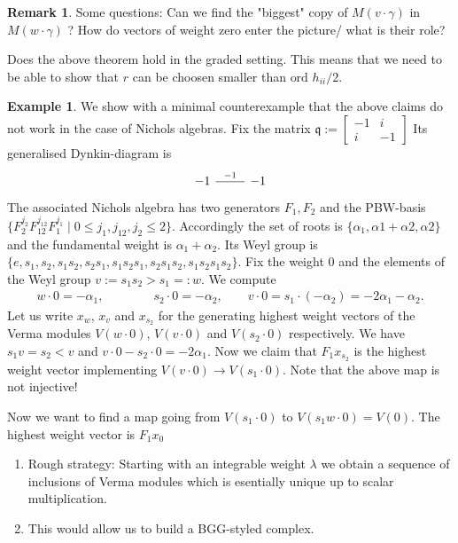 \documentclass{amsart}
\theoremstyle{definition}
\newtheorem*{remark}{Remark}
\newtheorem{example}[theorem]{Example}
\begin{document}
\begin{remark}
	Some questions:
	Can we find the "biggest" copy of $M(v \cdot\gamma)$ in $M(w \cdot \gamma)$ ?
	How do vectors of weight zero enter the picture/ what is their role?
	
	Does the above theorem hold in the graded setting. This means that we need to be able to show that $r$ can be choosen smaller than $\text{ord } h_{ii}/2$.
\end{remark}



\begin{example}
	We show with a minimal counterexample that the above claims do not work in the case of Nichols algebras.	
	Fix the matrix 
	$\mathfrak q:= 
	\begin{bmatrix}
		-1 & i \\
		i & -1
	\end{bmatrix}
	$
	Its generalised Dynkin-diagram is
	\begin{equation}
		\begin{tikzcd}[arrows=-]
		 -1 \arrow[r, "-1"] &
		 -1
		\end{tikzcd}
	\end{equation}
	The associated Nichols algebra has two generators $F_1, F_2$ and the 
	PBW-basis $\{F_2^{j_2} F_{12}^{j_{12}} F_1^{j_1} \mid 0 \leq j_1, j_{12}, j_2 \leq 2\}$.
	Accordingly the set of roots is $\{\alpha_1, \alpha 1+ \alpha 2, \alpha 2\}$ and the fundamental weight is $\alpha_1 + \alpha_2$.
	Its Weyl group is $\{e, s_1, s_2, s_1 s_2, s_2 s_1, s_1 s_2 s_1, s_2 s_1 s_2, s_1 s_2 s_1 s_2\}$.
	Fix the weight $0$  and the elements of the Weyl group 
	$v := s_1 s_2 > s_1 =: w$.
	We compute
	\begin{gather}
		w \cdot 0 = - \alpha_1, \qquad \qquad s_2 \cdot 0 = - \alpha_2, \qquad v \cdot 0 = s_1 \cdot (- \alpha_2) = -2 \alpha_1 - \alpha_2.
	\end{gather}
	Let us write $x_w$, $x_v$ and $x_{s_2}$ for the generating highest weight vectors of the Verma modules $V(w\cdot 0)$, $V(v\cdot 0 )$ and $V(s_2 \cdot 0)$ respectively.
	We have $s_1v = s_2 < v$ and $v\cdot 0 -s_2 \cdot 0 = -2 \alpha_1$.
	Now we claim that $F_1 x_{s_2}$ is the highest weight vector implementing $V(v\cdot 0) \rightarrow V(s_1 \cdot 0)$.
	Note that the above map is not injective!
	
	Now we want to find a map going from $V(s_1 \cdot 0)$ to $V(s_1 w \cdot 0) = V(0)$.
	The highest weight vector is $F_1x_0$ 
\end{example}
\begin{enumerate}
	\item Rough strategy: Starting with an integrable weight $\lambda$ we obtain a sequence of inclusions of Verma modules which is esentially unique up to scalar multiplication. 
	\item This would allow us to build a BGG-styled complex.
\end{enumerate}
\end{document}
